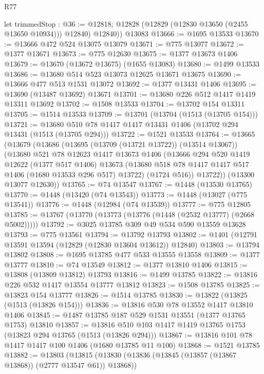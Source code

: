 \begin{lexlean}{R77}
\begin{coremodule}
{{        let trimmedStop : @36 := @12818;
        @12828 (@12829 (@12830 @13650 (@2455 @13650 @10934))) @12840)
        @12840))
    @13083
@13666 := @1695 @13533
@13670 := @13666 @472 @524 @13075 @13079
@13671 := @775 @13077
@13672 := @1377 @13671
@13673 := @775 @12630
@13675 := @1377 @13673 @1406
@13679 := @13670 (@13672 @13675) (@1655 @13083)
@13680 := @1499 @13533
@13686 := @13680 @514 @523 @13073 @12625 @13671 @13675
@13690 := @13666 @477 @513 @1531 @13072
@13692 := @1377 @13431 @1406
@13695 := @13690 (@13487 @13692) @13671
@13701 := @13680 @226 @512 @1417 @1419 @13311 @13692
@13702 := @1508 @13533
@13704 := @13702 @154 @13311
@13705 := @1514 @13533
@13709 := @13701 (@13704 (@1513 (@13705 @154)))
@13721 := @13680 @510 @78 @1417 @1417 @13431 @1406 (@13702 @294 @13431 (@1513 (@13705 @294)))
@13722 := @1521 @13533
@13764 := @13665
    (@13679
      (@13686
        (@13695 (@13709 (@13721 @13722)) (@13514 @13067))
        (@13680
          @521
          @78
          @12623
          @1417
          @13673
          @1406
          (@13666
            @294
            @520
            @1419
            @12622
            (@1377 @517 @1406)
            @13673
            (@13680 @518 @78 @1417 @1417 @517 @1406 (@1680 @13533 @296 @517) @13722)
            (@1724 @516))
          @13722))
      (@13300 @13077 @12630))
@13765 := @74 @13547
@13767 := @1448 (@13530 @13765)
@13770 := @1448 (@13420 (@74 @13543))
@13773 := @1448 (@13027 (@775 @13541))
@13776 := @1448 (@12984 (@74 @13539))
@13777 := @775 @12805
@13785 := @13767 (@13770 (@13773 (@13776 (@1448 (@2532 @13777) (@2668 @5002)))))
@13792 := @3025 @13785 @309 @49 @534 @590 @13559 @13628
@13793 := @775 @13561
@13794 := @13792 @13793
@13802 := @1401 (@12791 @13591 @13594 (@12829 (@12830 @13604 @13612)) @12840)
@13803 := @13794 @13802
@13808 := @1695 @13785 @477 @533 @13555 @13558
@13809 := @1377 @13777
@13810 := @74 @13549
@13812 := @1377 @13810 @1406
@13815 := @13808 (@13809 @13812) @13793
@13816 := @1499 @13785
@13822 := @13816 @226 @532 @1417 @13554 @13777 @13812
@13823 := @1508 @13785
@13825 := @13823 @154 @13777
@13826 := @1514 @13785
@13830 := @13822 (@13825 (@1513 (@13826 @154)))
@13836 := @13816 @530 @78 @13552 @1417 @13810 @1406
@13845 := @1487 @13785 @187 @529 @1531 @13551 (@1377 @13765 @1753) @13810
@13857 := @13816 @510 @103 @1417 @1419 @13765 @1753 (@13823 @294 @13765 (@1513 (@13826 @294)))
@13867 := @13816 @101 @78 @1417 @1417 @100 @1406 (@1680 @13785 @11 @100)
@13868 := @1521 @13785
@13882 := @13803
    (@13815
      (@13830 (@13836 (@13845 (@13857 (@13867 @13868)) (@2777 @13547 @61)) @13868))
}}
\end{coremodule}
\end{lexlean}
